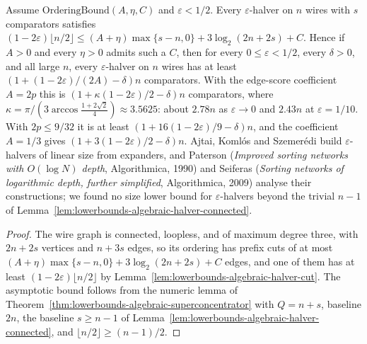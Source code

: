 \begin{theorem}
  \label{thm:lowerbounds-algebraic-halver}
  \leanok
  Assume $\mathrm{OrderingBound}(A,\eta,C)$ and $\varepsilon<1/2$. Every $\varepsilon$-halver on
  $n$ wires with $s$ comparators satisfies
  $(1-2\varepsilon)\lfloor n/2\rfloor\le(A+\eta)\max\{s-n,0\}+3\log_2(2n+2s)+C$. Hence if $A>0$
  and every $\eta>0$ admits such a $C$, then for every $0\le\varepsilon<1/2$, every $\delta>0$,
  and all large $n$, every $\varepsilon$-halver on $n$ wires has at least
  $(1+(1-2\varepsilon)/(2A)-\delta)n$ comparators. With the edge-score coefficient $A=2p$ this
  is $(1+\kappa(1-2\varepsilon)/2-\delta)n$ comparators, where
  $\kappa=\pi/(3\arccos\tfrac{1+2\sqrt2}{4})\approx3.5625$: about $2.78n$ as
  $\varepsilon\to0$ and $2.43n$ at $\varepsilon=1/10$. With $2p\le9/32$ it is at least
  $(1+16(1-2\varepsilon)/9-\delta)n$, and the coefficient $A=1/3$ gives
  $(1+3(1-2\varepsilon)/2-\delta)n$. Ajtai, Koml\'os and Szemer\'edi build $\varepsilon$-halvers
  of linear size from expanders, and Paterson (\emph{Improved sorting networks with $O(\log N)$
  depth}, Algorithmica, 1990) and Seiferas (\emph{Sorting networks of logarithmic depth, further
  simplified}, Algorithmica, 2009) analyse their constructions; we found no size lower bound for
  $\varepsilon$-halvers beyond the trivial $n-1$ of
  Lemma~\ref{lem:lowerbounds-algebraic-halver-connected}.
\end{theorem}
\begin{proof}
  \leanok
  The wire graph is connected, loopless, and of maximum degree three, with $2n+2s$ vertices
  and $n+3s$ edges, so its ordering has prefix cuts of at most
  $(A+\eta)\max\{s-n,0\}+3\log_2(2n+2s)+C$ edges, and one of them has at least
  $(1-2\varepsilon)\lfloor n/2\rfloor$ by Lemma~\ref{lem:lowerbounds-algebraic-halver-cut}.
  The asymptotic bound follows from the numeric lemma of
  Theorem~\ref{thm:lowerbounds-algebraic-superconcentrator} with $Q=n+s$, baseline $2n$, the
  baseline $s\ge n-1$ of Lemma~\ref{lem:lowerbounds-algebraic-halver-connected}, and
  $\lfloor n/2\rfloor\ge(n-1)/2$.
\end{proof}

